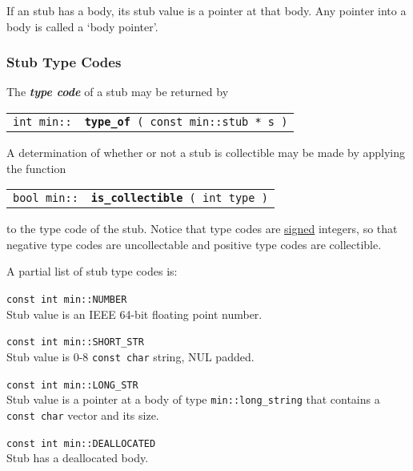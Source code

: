 \documentclass[12pt]{article}
\makeatletter
\newcommand{\key}[1]{{\bf \em #1}\index{#1}}
\newcommand{\ttindex}[1]{\index{#1@{\tt #1}}}
\newcommand{\minindex}[1]{\ttindex{min::#1}\ttindex{#1}}
\newcommand{\EOL}{\penalty \exhyphenpenalty}
\newenvironment{indpar}[1][0.3in]%
	{\begin{list}{}%
		     {\setlength{\itemsep}{0in}%
		      \setlength{\topsep}{0in}%
		      \setlength{\parsep}{1ex}%
		      \setlength{\labelwidth}{#1}%
		      \setlength{\leftmargin}{#1}%
		      \addtolength{\leftmargin}{\labelsep}}%
	 \item}%
	{\end{list}}
\newcommand{\LABEL}[1]{\label{#1}}
\newcommand{\MINKEY}[1]{{\tt \bf #1}\minindex{#1}}
\makeatother
\begin{document}
If an stub has a body, its stub value is a pointer at that body.
Any pointer into a body is called a `body pointer'.

\subsubsection{Stub Type Codes}
\label{STUB-TYPE-CODES}

The \key{type code} of a stub may be returned by

\begin{indpar}\begin{tabular}{r@{}l}
\verb|int min::| & \MINKEY{type\_of}\verb| ( const min::stub * s )|
\LABEL{MIN::TYPE_OF}
\end{tabular}\end{indpar}

A determination of whether or not a stub is collectible may be made
by applying the function

\begin{indpar}\begin{tabular}{r@{}l}
\verb|bool min::| & \MINKEY{is\_collectible}\verb| ( int type )|
\LABEL{MIN::IS_COLLECTIBLE}
\end{tabular}\end{indpar}

to the type code of the stub.  Notice that type codes are \underline{signed}
integers, so that negative type codes are uncollectable and positive type codes
are collectible.

A partial list of stub type codes is:

\begin{indpar}
\begin{list}{}{}
\item[{\tt const int min::NUMBER}]~\\
Stub value is an IEEE 64-bit floating point number.
\item[{\tt const int min::SHORT\_STR}]~\\
Stub value is 0-8 \verb|const char| string, NUL padded.
\item[{\tt const int min::LONG\_STR}]~\\
Stub value is a pointer at a body of type {\tt min::long\_\EOL string}
that contains a \verb|const char| vector and its size. 
\item[{\tt const int min::DEALLOCATED}]~\\
Stub has a deallocated body.
\end{list}
\end{indpar}
\end{document}
